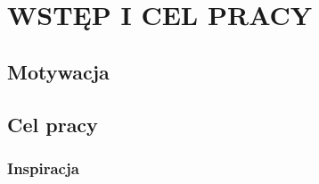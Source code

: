 \chapter{WSTĘP I CEL PRACY}
\label{chap:introduction}


\section{Motywacja}


\section{Cel pracy}




\subsection{Inspiracja}

